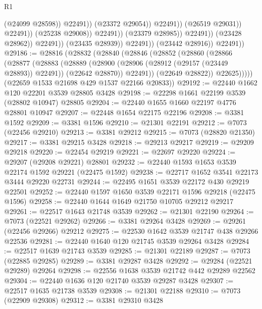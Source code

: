 \begin{lexlean}{R1}
\begin{coremodule}
                                                    (@24099 @28598))
                                                  @22491))
                                              (@23372 @29054))
                                            @22491))
                                        (@26519 @29031))
                                      @22491))
                                  (@25238 @29008))
                                @22491))
                            (@23379 @28985))
                          @22491))
                      (@23428 @28962))
                    @22491))
                (@23435 @28939))
              @22491))
          (@23442 @28916))
        @22491))
@29186 := @28816
    (@28832
      (@28840
        (@28846
          (@28852
            (@28860
              (@28866
                (@28877
                  (@28883
                    (@28889
                      (@28900 (@28906 (@28912 (@29157 (@23449 @28893)) @22491)) (@22642 @28870))
                      @22491))
                  (@22649 @28822))
                @22625)))))
      (@22659 @1533 @21698 @429 @1537 @22166 @20833))
@29192 := @22440 @1662 @120 @22201 @3539 @28805 @3428
@29198 := @22298 @1661 @22199 @3539 (@28802 @10947) @28805
@29204 := @22440 @1655 @1660 @22197 @4776 @28801 @10947
@29207 := @22448 @1654 @22175 @22196
@29208 := @3381 @1592
@29209 := @3381 @1596
@29210 := @21301 @22191
@29212 := @7073 (@22456 @29210)
@29213 := @3381 @29212
@29215 := @7073 (@28820 @21350)
@29217 := @3381 @29215 @3428
@29218 := @29213 @29217
@29219 := @29209 @29218
@29220 := @22454 @29219
@29221 := @22697 @29220
@29224 := @29207 (@29208 @29221) @28801
@29232 := @22440 @1593 @1653 @3539 @22174 @1592 @29221 (@22475 @1592)
@29238 := @22717 @1652 @3541 @22173 @3444 @29220 @22731
@29244 := @22495 @1651 @3539 @22172 @430 @29219 @22501
@29252 := @22440 @1597 @1650 @3539 @22171 @1596 @29218 (@22475 @1596)
@29258 := @22440 @1644 @1649 @21750 @10705 @29212 @29217
@29261 := @22517 @1643 @21748 @3539
@29262 := @21301 @22190
@29264 := @7073 (@22521 @29262)
@29266 := @3381 @29264 @3428
@29269 := @29261 (@22456 @29266) @29212
@29275 := @22530 @1642 @3539 @21747 @438 @29266 @22536
@29281 := @22440 @1640 @120 @21745 @3539 @29264 @3428
@29284 := @22517 @1639 @21743 @3539
@29285 := @21301 @22189
@29287 := @7073 (@22885 @29285)
@29289 := @3381 @29287 @3428
@29292 := @29284 (@22521 @29289) @29264
@29298 := @22556 @1638 @3539 @21742 @442 @29289 @22562
@29304 := @22440 @1636 @120 @21740 @3539 @29287 @3428
@29307 := @22517 @1635 @21738 @3539
@29308 := @21301 @22188
@29310 := @7073 (@22909 @29308)
@29312 := @3381 @29310 @3428

\end{coremodule}
\end{lexlean}
